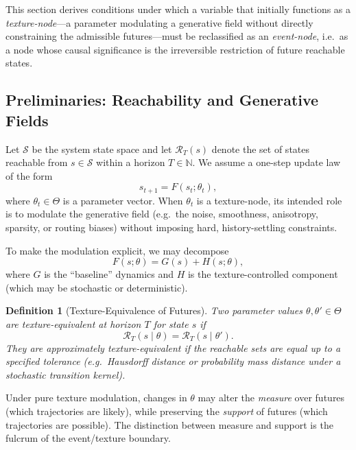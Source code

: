 \documentclass[11pt]{article}
\newtheorem{definition}{Definition}
\newcommand{\State}{\mathcal{S}}
\begin{document}
This section derives conditions under which a variable that initially functions
as a \emph{texture-node}---a parameter modulating a generative field without
directly constraining the admissible futures---must be reclassified as an
\emph{event-node}, i.e.\ as a node whose causal significance is the irreversible
restriction of future reachable states.

\subsection{Preliminaries: Reachability and Generative Fields}

Let $\State$ be the system state space and let $\mathcal{R}_T(s)$ denote the
set of states reachable from $s \in \State$ within a horizon $T \in \mathbb{N}$.
We assume a one-step update law of the form
\begin{equation}
s_{t+1} = F(s_t;\theta_t),
\end{equation}
where $\theta_t \in \Theta$ is a parameter vector. When $\theta_t$ is a
texture-node, its intended role is to modulate the generative field (e.g.\ the
noise, smoothness, anisotropy, sparsity, or routing biases) without imposing
hard, history-settling constraints.

To make the modulation explicit, we may decompose
\begin{equation}
F(s;\theta) = G(s) + H(s;\theta),
\end{equation}
where $G$ is the ``baseline'' dynamics and $H$ is the texture-controlled
component (which may be stochastic or deterministic).

\begin{definition}[Texture-Equivalence of Futures]
Two parameter values $\theta,\theta' \in \Theta$ are \emph{texture-equivalent at
horizon $T$} for state $s$ if
\begin{equation}
\mathcal{R}_T(s \mid \theta) = \mathcal{R}_T(s \mid \theta').
\end{equation}
They are \emph{approximately texture-equivalent} if the reachable sets are
equal up to a specified tolerance (e.g.\ Hausdorff distance or probability mass
distance under a stochastic transition kernel).
\end{definition}

Under pure texture modulation, changes in $\theta$ may alter the \emph{measure}
over futures (which trajectories are likely), while preserving the \emph{support}
of futures (which trajectories are possible). The distinction between measure
and support is the fulcrum of the event/texture boundary.
\end{document}
